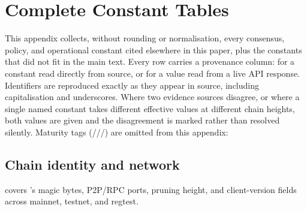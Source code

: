 \section{Complete Constant Tables}
\label{app:constants}\label{sec:app-constants}\label{sec:A-constants}

This appendix collects, without rounding or normalisation, every consensus, policy, and
operational constant cited elsewhere in this paper, plus the constants that did not fit
in the main text. Every row carries a provenance column:  for a
constant read directly from source, or  for a value read from
a live API response. Identifiers are reproduced exactly as they appear in source,
including capitalisation and underscores. Where two evidence sources disagree, or where a
single named constant takes different effective values at different chain heights, both
values are given and the disagreement is marked rather than resolved silently. Maturity
tags (\shipped/\inprogress/\planned/\vision) are omitted from this appendix: 

\subsection{Chain identity and network}

 covers \fluxd's magic bytes, P2P/RPC ports, pruning height, and
client-version fields across mainnet, testnet, and regtest.

